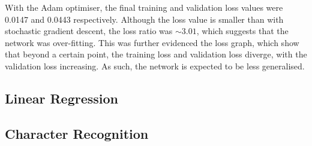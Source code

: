 With the Adam optimiser, the final training and validation loss values were
0.0147 and 0.0443 respectively.
Although the loss value is smaller than with stochastic gradient descent, the
loss ratio was $\sim3.01$, which suggests that the network was over-fitting.
This was further evidenced the loss graph, which show that beyond a certain
point, the training loss and validation loss diverge, with the validation loss
increasing.
As such, the network is expected to be less generalised.
\vspace{-2em}






\subsection{Linear Regression}


\subsection{Character Recognition}



